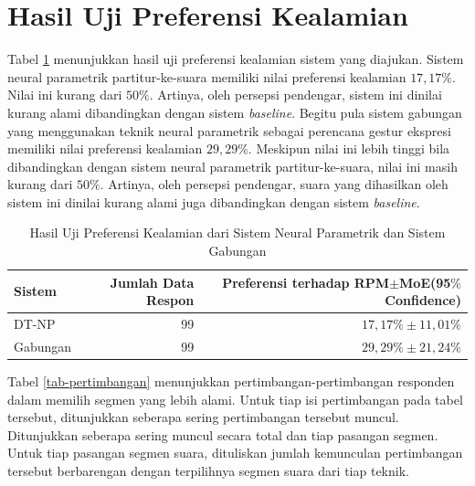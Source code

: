 
\section{Hasil Uji Preferensi Kealamian}

Tabel \ref{tab-preference} menunjukkan hasil uji preferensi kealamian sistem yang diajukan. Sistem neural parametrik partitur-ke-suara memiliki nilai preferensi kealamian $17,17\%$. Nilai ini kurang dari $50\%$. Artinya, oleh persepsi pendengar, sistem ini dinilai kurang alami dibandingkan dengan sistem \textit{baseline}. Begitu pula sistem gabungan yang menggunakan teknik neural parametrik sebagai perencana gestur ekspresi memiliki nilai preferensi kealamian $29,29\%$. Meskipun nilai ini lebih tinggi bila dibandingkan dengan sistem neural parametrik partitur-ke-suara, nilai ini masih kurang dari $50\%$. Artinya, oleh persepsi pendengar, suara yang dihasilkan oleh sistem ini dinilai kurang alami juga dibandingkan dengan sistem \textit{baseline}.

\begin{table}[htbp] %
  \begin{center}
    \caption{Hasil Uji Preferensi Kealamian dari Sistem Neural Parametrik dan Sistem Gabungan}
    \label{tab-preference}
    \begin{tabular}{|l|r|r|}
    \hline
	Sistem&Jumlah Data Respon&Preferensi terhadap RPM$\pm$MoE(95$\%$ Confidence)\\
	\hline
	DT-NP	&99	&$17,17\%\pm11,01\%$\\
	\hline
	Gabungan	&99	&$29,29\%\pm21,24\%$\\
	\hline
    \end{tabular}
  \end{center}
\end{table}

Tabel \ref{tab-pertimbangan} menunjukkan pertimbangan-pertimbangan responden dalam memilih segmen yang lebih alami. Untuk tiap isi pertimbangan pada tabel tersebut, ditunjukkan seberapa sering pertimbangan tersebut muncul. Ditunjukkan seberapa sering muncul secara total dan tiap pasangan segmen. Untuk tiap pasangan segmen suara, dituliskan jumlah kemunculan pertimbangan tersebut berbarengan dengan terpilihnya segmen suara dari tiap teknik.

